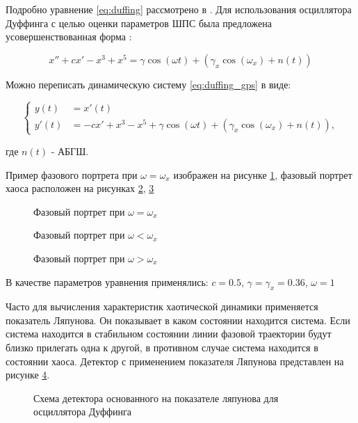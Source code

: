 Подробно уравнение \ref{eq:duffing} рассмотрено в \cite{chaos_neimark_landa}.
Для использования осциллятора Дуффинга с целью оценки параметров ШПС была предложена усовершенствованная форма \cite{chaos_song, chaos_chen}:
\begin{center}
\begin{equation}
	\label{eq:duffing_gps}
	x'' +cx' - x^3 + x^5 = \gamma\cos(\omega{t}) + (\gamma_{x}\cos(\omega_{x}) + n(t))
\end{equation}
\end{center}

Можно переписать динамическую систему \ref{eq:duffing_gps} в виде:
\begin{center}
\begin{equation}
	\label{eq:duffing_gps_2}
	\left\{
	\begin{aligned}
		y(t) & = x'(t) \\
		y'(t) & =  -cx' + x^3 - x^5 + \gamma\cos(\omega{t}) + (\gamma_{x}\cos(\omega_{x}) + n(t)),
	\end{aligned}
	\right.
\end{equation}
\end{center}
где ${n(t)}$ - АБГШ.

Пример фазового портрета при ${\omega=\omega_{x}}$ изображен на рисунке \ref{pic:duffing_sync},
фазовый портрет хаоса расположен на рисунках \ref{pic:duffing_chaos1}, \ref{pic:duffing_chaos2}
\begin{figure}[h]
	\center{}
	\caption{Фазовый портрет при ${\omega =\omega_{x}}$}
	\label{pic:duffing_sync}
\end{figure}
\begin{figure}[h]
	\center{}
	\caption{Фазовый портрет при ${\omega < \omega_{x}}$}
	\label{pic:duffing_chaos1}
\end{figure}
\begin{figure}[h]
	\center{}
	\caption{Фазовый портрет при ${\omega > \omega_{x}}$}
	\label{pic:duffing_chaos2}
\end{figure}
В качестве параметров уравнения применялись: $c = 0.5$, $\gamma=\gamma_{x}=0.36$, ${\omega=1}$

Часто для вычисления характеристик хаотической динамики применяется показатель Ляпунова.
Он показывает в каком состоянии находится система. Если система находится
в стабильном состоянии линии фазовой траектории будут близко прилегать одна к другой, в противном
случае система находится в состоянии хаоса. Детектор с применением показателя Ляпунова
представлен на рисунке \ref{pic:chaos_lyapunov}.
\begin{figure}[h]
	\center{}
	\caption{Схема детектора основанного на показателе ляпунова для осциллятора Дуффинга}
	\label{pic:chaos_lyapunov}
\end{figure}

